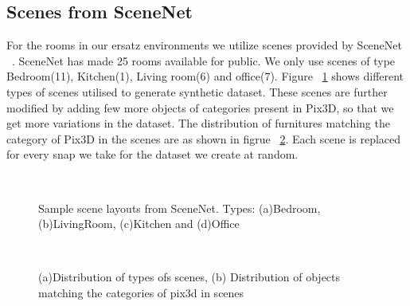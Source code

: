 \subsection{Scenes from SceneNet}
For the rooms in our ersatz environments we utilize scenes provided by SceneNet ~\cite{McCormac:etal:ICCV2017}.
SceneNet has made 25 rooms available for public.
We only use scenes of type Bedroom(11), Kitchen(1), Living room(6) and office(7).
Figure ~\ref{fig:Scene Types} shows different types of scenes utilised to generate synthetic dataset.
These scenes are further modified by adding few more objects of categories present in Pix3D, so that we get more variations in the dataset.
The distribution of furnitures matching the category of Pix3D in the scenes are as shown in figrue ~\ref{fig:distribution of scenes}.
Each scene is replaced for every snap we take for the dataset we create at random.


\begin{figure}[!ht]
    \centering
    \quad
    \\
    \quad
    \caption{Sample scene layouts from SceneNet. Types: (a)Bedroom, (b)LivingRoom, (c)Kitchen and (d)Office}
    \label{fig:Scene Types}
\end{figure}

\begin{figure}[!ht]
    \centering
    \quad
    \\
    \caption{(a)Distribution of types ofs scenes, (b) Distribution of objects matching the categories of pix3d in scenes}
    \label{fig:distribution of scenes}
\end{figure}

